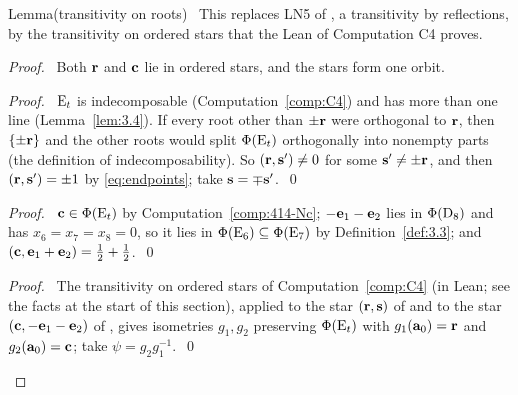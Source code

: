 \begin{namedresult}{Lemma}{(transitivity on roots)}\label{lem:414-transitive}
 \new\ This replaces LN5 of , a transitivity by reflections, by the
 transitivity on ordered stars that the Lean of Computation C4 proves.
\end{namedresult}
\begin{proof}
 \pfsketch\ Both ${\mathbf r}$ and ${\mathbf c}$ lie in ordered stars, and the stars form one orbit.
 \begin{proof}\pf\ $\mathrm{E}_t$ is indecomposable (Computation~\ref{comp:C4}) and has more than one
  line (Lemma~\ref{lem:3.4}). If every root other than $\pm{\mathbf r}$ were orthogonal to ${\mathbf r}$, then
  $\{\pm{\mathbf r}\}$ and the other roots would split $\Phi(\mathrm{E}_t)$ orthogonally into nonempty parts
  (the definition of indecomposability). So $({\mathbf r},{\mathbf s}')\ne0$ for some ${\mathbf s}'\ne\pm{\mathbf r}$, and then
  $({\mathbf r},{\mathbf s}')=\pm1$ by \eqref{eq:endpoints}; take ${\mathbf s}=\mp{\mathbf s}'$.~\qed\end{proof}
 \begin{proof}\pf\ ${\mathbf c}\in\Phi(\mathrm{E}_t)$ by Computation~\ref{comp:414-Nc}; $-{\mathbf e}_1-{\mathbf e}_2$ lies in
  $\Phi(\mathrm{D}_8)$ and has $x_6=x_7=x_8=0$, so it lies in $\Phi(\mathrm{E}_6)\subseteq\Phi(\mathrm{E}_7)$ by
  Definition~\ref{def:3.3}; and $({\mathbf c},{\mathbf e}_1+{\mathbf e}_2)=\frac12+\frac12$.~\qed\end{proof}
 \qedstep
 \begin{proof}\pf\ The transitivity on ordered stars of Computation~\ref{comp:C4} (in
  Lean; see the facts at the start of this section), applied to the star
  $({\mathbf r},{\mathbf s})$ of  and to the star $({\mathbf c},-{\mathbf e}_1-{\mathbf e}_2)$ of ,
  gives isometries $g_1,g_2$ preserving $\Phi(\mathrm{E}_t)$ with $g_1({\mathbf a}_0)={\mathbf r}$ and
  $g_2({\mathbf a}_0)={\mathbf c}$; take $\psi=g_2g_1^{-1}$.~\qed\end{proof}
\end{proof}

